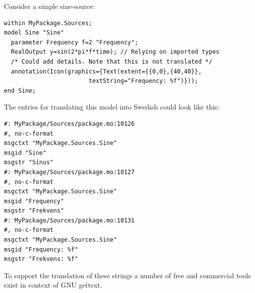 \begin{example}
Consider a simple sine-source:
\begin{lstlisting}[language=modelica]
within MyPackage.Sources;
model Sine "Sine"
  parameter Frequency f=2 "Frequency";
  RealOutput y=sin(2*pi*f*time); // Relying on imported types
  /* Could add details. Note that this is not translated */
  annotation(Icon(graphics={Text(extent={{0,0},{40,40}},
                        textString="Frequency: %f")}));
end Sine;
\end{lstlisting}
The entries for translating this model into Swedish could look like this:
\begin{lstlisting}
#: MyPackage/Sources/package.mo:10126
#, no-c-format
msgctxt "MyPackage.Sources.Sine"
msgid "Sine"
msgstr "Sinus"
#: MyPackage/Sources/package.mo:10127
#, no-c-format
msgctxt "MyPackage.Sources.Sine"
msgid "Frequency"
msgstr "Frekvens"
#: MyPackage/Sources/package.mo:10131
#, no-c-format
msgctxt "MyPackage.Sources.Sine"
msgid "Frequency: %f"
msgstr "Frekvens: %f"
\end{lstlisting}
\end{example}

\begin{nonnormative}
To support the translation of these strings a number of free and commercial tools exist in context of GNU gettext.
\end{nonnormative}
